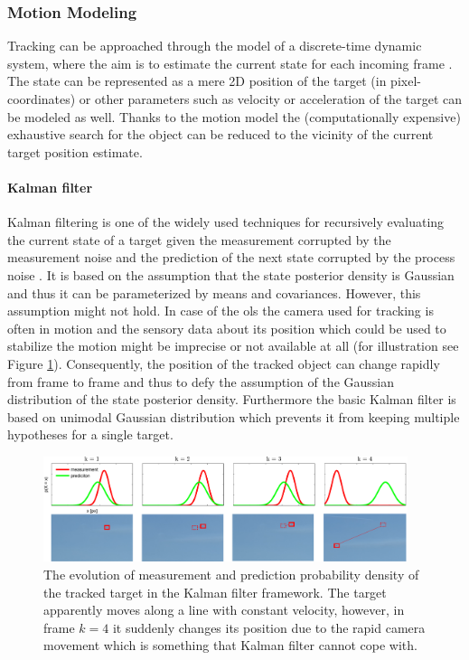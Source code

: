 \subsubsection*{Motion Modeling}
Tracking can be approached through the model of a discrete-time dynamic system, where the aim is to estimate the current state for each incoming frame \cite{Comaniciu:2003:KOT:776753.776799}. The state can be represented as a mere 2D position of the target (in pixel-coordinates) or other parameters such as velocity or acceleration of the target can be modeled as well. Thanks to the motion model the (computationally expensive) exhaustive search for the object can be reduced to the vicinity of the current target position estimate.

\paragraph{Kalman filter} 
Kalman filtering is one of the widely used techniques for recursively evaluating the current state of a target given the measurement corrupted by the measurement noise and the prediction of the next state corrupted by the process noise \cite{Welch:1995:IKF:897831, cuevas2005kalman}. It is based on the assumption that the state posterior density is Gaussian and thus it can be parameterized by means and covariances. However, this assumption might not hold. In case of the \gls{ols} the camera used for tracking is often in motion and the sensory data about its position which could be used to stabilize the motion might be imprecise or not available at all (for illustration see Figure \ref{fig:kalman}). Consequently, the position of the tracked object can change rapidly from frame to frame and thus to defy the assumption of the Gaussian distribution of the state posterior density. Furthermore the basic Kalman filter is based on unimodal Gaussian distribution which prevents it from keeping multiple hypotheses for a single target.

\begin{figure}[tbh]
	\centering
	\includegraphics[width=0.95\textwidth]{fig/kalman.pdf}
	\caption{The evolution of measurement and prediction probability density of the tracked target in the Kalman filter framework. The target apparently moves along a line with constant velocity, however, in frame $k = 4$ it suddenly changes its position due to the rapid camera movement which is something that Kalman filter cannot cope with.}
	\label{fig:kalman}
\end{figure}

